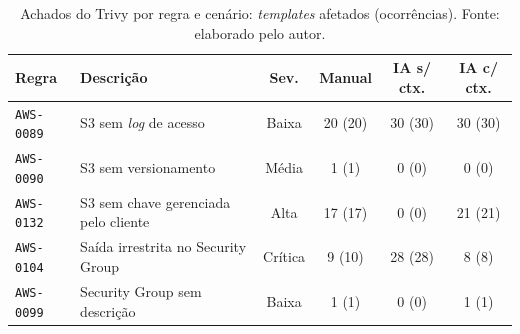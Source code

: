 \begin{table}[H]
\centering
\caption{Achados do Trivy por regra e cenário: \textit{templates} afetados (ocorrências). Fonte: elaborado pelo autor.}
\label{tab:apx-trivy-regra}
\small
\begin{tabularx}{\textwidth}{l|>{\raggedright\arraybackslash}X|c|c|c|c}
\hline
\textbf{Regra} & \textbf{Descrição} & \textbf{Sev.} & \textbf{Manual} & \textbf{IA s/ ctx.} & \textbf{IA c/ ctx.} \\
\hline
\texttt{AWS-0089} & S3 sem \textit{log} de acesso & Baixa & 20 (20) & 30 (30) & 30 (30) \\
\texttt{AWS-0090} & S3 sem versionamento & Média & 1 (1) & 0 (0) & 0 (0) \\
\texttt{AWS-0132} & S3 sem chave gerenciada pelo cliente & Alta & 17 (17) & 0 (0) & 21 (21) \\
\texttt{AWS-0104} & Saída irrestrita no Security Group & Crítica & 9 (10) & 28 (28) & 8 (8) \\
\texttt{AWS-0099} & Security Group sem descrição & Baixa & 1 (1) & 0 (0) & 1 (1) \\
\hline
\end{tabularx}
\end{table}
